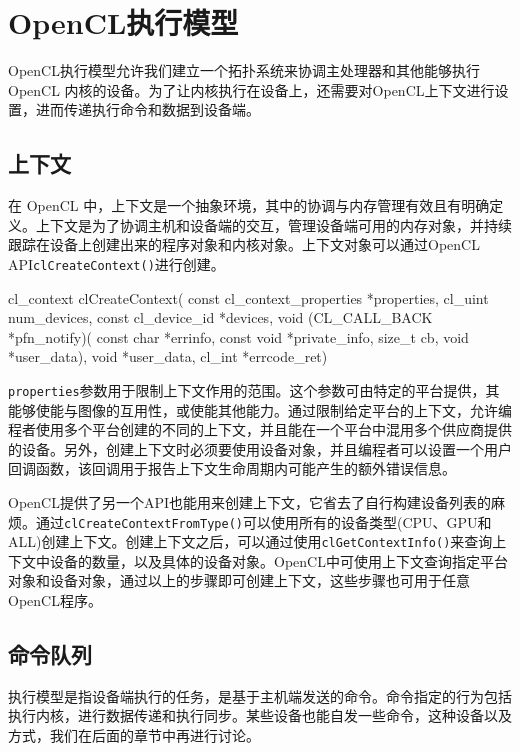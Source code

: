 \section{OpenCL执行模型}

OpenCL执行模型允许我们建立一个拓扑系统来协调主处理器和其他能够执行OpenCL 内核的设备。为了让内核执行在设备上，还需要对OpenCL上下文进行设置，进而传递执行命令和数据到设备端。

\subsection{上下文}

在 OpenCL 中，上下文是一个抽象环境，其中的协调与内存管理有效且有明确定义。上下文是为了协调主机和设备端的交互，管理设备端可用的内存对象，并持续跟踪在设备上创建出来的程序对象和内核对象。上下文对象可以通过OpenCL API\texttt{clCreateContext()}进行创建。

\begin{codebox}[cpp]
cl_context
clCreateContext(
  const cl_context_properties *properties,
  cl_uint num_devices,
  const cl_device_id *devices,
  void (CL_CALL_BACK *pfn_notify)(
    const char *errinfo,
    const void *private_info,
    size_t cb,
    void *user_data),
  void *user_data,
  cl_int *errcode_ret)
\end{codebox}

\texttt{properties}参数用于限制上下文作用的范围。这个参数可由特定的平台提供，其能够使能与图像的互用性，或使能其他能力。通过限制给定平台的上下文，允许编程者使用多个平台创建的不同的上下文，并且能在一个平台中混用多个供应商提供的设备。另外，创建上下文时必须要使用设备对象，并且编程者可以设置一个用户回调函数，该回调用于报告上下文生命周期内可能产生的额外错误信息。

OpenCL提供了另一个API也能用来创建上下文，它省去了自行构建设备列表的麻烦。通过\texttt{clCreateContextFromType()}可以使用所有的设备类型(CPU、GPU和ALL)创建上下文。创建上下文之后，可以通过使用\texttt{clGetContextInfo()}来查询上下文中设备的数量，以及具体的设备对象。OpenCL中可使用上下文查询指定平台对象和设备对象，通过以上的步骤即可创建上下文，这些步骤也可用于任意OpenCL程序。

\subsection{命令队列}

执行模型是指设备端执行的任务，是基于主机端发送的命令。命令指定的行为包括执行内核，进行数据传递和执行同步。某些设备也能自发一些命令，这种设备以及方式，我们在后面的章节中再进行讨论。

